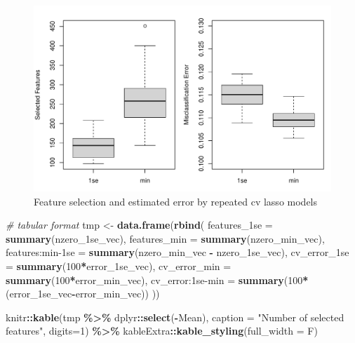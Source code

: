 \documentclass[
]{book}
\newenvironment{Shaded}{\begin{snugshade}}{\end{snugshade}}
\newcommand{\CommentTok}[1]{\textcolor[rgb]{0.56,0.35,0.01}{\textit{#1}}}
\newcommand{\DataTypeTok}[1]{\textcolor[rgb]{0.13,0.29,0.53}{#1}}
\newcommand{\DecValTok}[1]{\textcolor[rgb]{0.00,0.00,0.81}{#1}}
\newcommand{\KeywordTok}[1]{\textcolor[rgb]{0.13,0.29,0.53}{\textbf{#1}}}
\newcommand{\NormalTok}[1]{#1}
\newcommand{\OperatorTok}[1]{\textcolor[rgb]{0.81,0.36,0.00}{\textbf{#1}}}
\newcommand{\StringTok}[1]{\textcolor[rgb]{0.31,0.60,0.02}{#1}}
\begin{document}
\begin{figure}
\centering
\includegraphics{Static/figures/brca-rnaseq-model-size-lassoAll-1.pdf}
\caption{\label{fig:brca-rnaseq-model-size-lassoAll}Feature selection and estimated error by repeated cv lasso models}
\end{figure}

\begin{Shaded}
\begin{Highlighting}[]
\CommentTok{\# tabular format}
\NormalTok{tmp <{-}}\StringTok{ }\KeywordTok{data.frame}\NormalTok{(}\KeywordTok{rbind}\NormalTok{(}
 \StringTok{\textasciigrave{}}\DataTypeTok{features\_1se}\StringTok{\textasciigrave{}}\NormalTok{ =}\StringTok{ }\KeywordTok{summary}\NormalTok{(nzero\_1se\_vec),}
 \DataTypeTok{features\_min =} \KeywordTok{summary}\NormalTok{(nzero\_min\_vec),}
 \StringTok{\textasciigrave{}}\DataTypeTok{features:min{-}1se}\StringTok{\textasciigrave{}}\NormalTok{ =}\StringTok{ }\KeywordTok{summary}\NormalTok{(nzero\_min\_vec }\OperatorTok{{-}}\StringTok{ }\NormalTok{nzero\_1se\_vec),}
 \StringTok{\textasciigrave{}}\DataTypeTok{cv\_error\_1se}\StringTok{\textasciigrave{}}\NormalTok{ =}\StringTok{ }\KeywordTok{summary}\NormalTok{(}\DecValTok{100}\OperatorTok{*}\NormalTok{error\_1se\_vec),}
 \DataTypeTok{cv\_error\_min =} \KeywordTok{summary}\NormalTok{(}\DecValTok{100}\OperatorTok{*}\NormalTok{error\_min\_vec),}
 \StringTok{\textasciigrave{}}\DataTypeTok{cv\_error:1se{-}min}\StringTok{\textasciigrave{}}\NormalTok{ =}\StringTok{ }\KeywordTok{summary}\NormalTok{(}\DecValTok{100}\OperatorTok{*}\NormalTok{(error\_1se\_vec}\OperatorTok{{-}}\NormalTok{error\_min\_vec))}
\NormalTok{))}

\NormalTok{knitr}\OperatorTok{::}\KeywordTok{kable}\NormalTok{(tmp }\OperatorTok{\%>\%}\StringTok{ }\NormalTok{dplyr}\OperatorTok{::}\KeywordTok{select}\NormalTok{(}\OperatorTok{{-}}\NormalTok{Mean),}
  \DataTypeTok{caption =} \StringTok{"Number of selected features"}\NormalTok{,}
  \DataTypeTok{digits=}\DecValTok{1}\NormalTok{) }\OperatorTok{\%>\%}
\StringTok{   }\NormalTok{kableExtra}\OperatorTok{::}\KeywordTok{kable\_styling}\NormalTok{(}\DataTypeTok{full\_width =}\NormalTok{ F)}
\end{Highlighting}
\end{Shaded}
\end{document}
